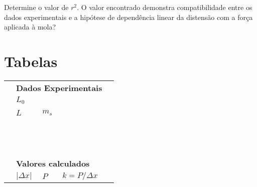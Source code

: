 \begin{question}[type={exam}]{1} 
Determine o valor de $r^2$. O valor encontrado demonstra compatibilidade entre os dados experimentais e a hipótese de dependência linear da distensão com a força aplicada à mola?
\end{question}
\vfill

\pagebreak
\section{Tabelas}

\begin{table}
\centering
\begin{tabular}{lp{25mm}p{25mm}p{25mm}l}
\toprule
	& \multicolumn{3}{l}{\textbf{Dados Experimentais}} \\
	\cmidrule{2-3}
	& \cellcolor[gray]{0.89} $L_0$ & \cellcolor[gray]{0.92} \\
	\cmidrule{2-3}
	\\
	\cmidrule{2-3}
	& $L$ & $m_s$ & \\
	\cmidrule{2-3}
	& \cellcolor[gray]{0.89} & \cellcolor[gray]{0.92} \\
	& \cellcolor[gray]{0.95} & \cellcolor[gray]{0.97} \\
	& \cellcolor[gray]{0.89} & \cellcolor[gray]{0.92} \\
	& \cellcolor[gray]{0.95} & \cellcolor[gray]{0.97} \\
	& \cellcolor[gray]{0.89} & \cellcolor[gray]{0.92} \\
	& \cellcolor[gray]{0.95} & \cellcolor[gray]{0.97} \\
	& \cellcolor[gray]{0.89} & \cellcolor[gray]{0.92} \\
	& \cellcolor[gray]{0.95} & \cellcolor[gray]{0.97} \\
	& \cellcolor[gray]{0.89} & \cellcolor[gray]{0.92} \\
	& \cellcolor[gray]{0.95} & \cellcolor[gray]{0.97} \\
	& \cellcolor[gray]{0.89} & \cellcolor[gray]{0.92} \\
	& \cellcolor[gray]{0.95} & \cellcolor[gray]{0.97} \\
	\cmidrule{2-4}
\\
	& \multicolumn{3}{l}{\textbf{Valores calculados}} \\
	\cmidrule{2-4}
	& $|\Delta x|$ & $P$ & $k = P/\Delta x$ \\

\end{tabular}
\end{table}
